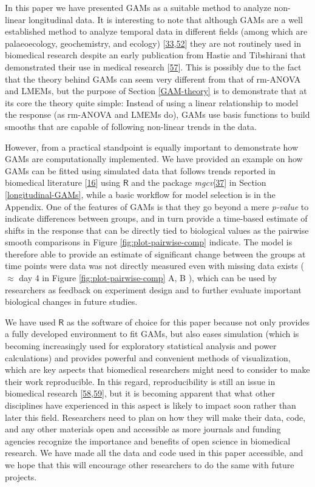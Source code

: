\documentclass[
]{article}
\begin{document}
In this paper we have presented GAMs as a suitable method to analyze non-linear longitudinal data. It is interesting to note that although GAMs are a well established method to analyze temporal data in different fields (among which are palaeoecology, geochemistry, and ecology) {[}\protect\hyperlink{ref-pedersen2019}{33},\protect\hyperlink{ref-hefley2017}{52}{]} they are not routinely used in biomedical research despite an early publication from Hastie and Tibshirani that demonstrated their use in medical research {[}\protect\hyperlink{ref-hastie1995}{57}{]}. This is possibly due to the fact that the theory behind GAMs can seem very different from that of rm-ANOVA and LMEMs, but the purpose of Section \ref{GAM-theory} is to demonstrate that at its core the theory quite simple: Instead of using a linear relationship to model the response (as rm-ANOVA and LMEMs do), GAMs use basis functions to build smooths that are capable of following non-linear trends in the data.

However, from a practical standpoint is equally important to demonstrate how GAMs are computationally implemented. We have provided an example on how GAMs can be fitted using simulated data that follows trends reported in biomedical literature {[}\protect\hyperlink{ref-vishwanath2009}{16}{]} using \(\textsf{R}\) and the package \emph{mgcv}{[}\protect\hyperlink{ref-wood2017}{37}{]} in Section \ref{longitudinal-GAMs}, while a basic workflow for model selection is in the Appendix. One of the features of GAMs is that they go beyond a mere \emph{p-value} to indicate differences between groups, and in turn provide a time-based estimate of shifts in the response that can be directly tied to biological values as the pairwise smooth comparisons in Figure \ref{fig:plot-pairwise-comp} indicate. The model is therefore able to provide an estimate of significant change between the groups at time points were data was not directly measured even with missing data exists ( \(\approx\) day 4 in Figure \ref{fig:plot-pairwise-comp} A, B ), which can be used by researchers as feedback on experiment design and to further evaluate important biological changes in future studies.

We have used \(\textsf{R}\) as the software of choice for this paper because not only provides a fully developed environment to fit GAMs, but also eases simulation (which is becoming increasingly used for exploratory statistical analysis and power calculations) and provides powerful and convenient methods of visualization, which are key aspects that biomedical researchers might need to consider to make their work reproducible. In this regard, reproducibility is still an issue in biomedical research {[}\protect\hyperlink{ref-begley2015}{58},\protect\hyperlink{ref-weissgerber2018}{59}{]}, but it is becoming apparent that what other disciplines have experienced in this aspect is likely to impact soon rather than later this field. Researchers need to plan on how they will make their data, code, and any other materials open and accessible as more journals and funding agencies recognize the importance and benefits of open science in biomedical research. We have made all the data and code used in this paper accessible, and we hope that this will encourage other researchers to do the same with future projects.
\end{document}
